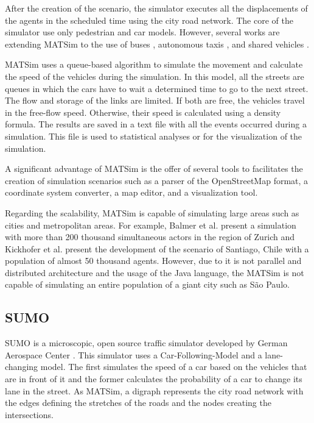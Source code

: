 After the creation of the scenario, the simulator executes all the displacements of the agents in the scheduled time using the city road network. The core of the simulator use only pedestrian and car models. However, several works are extending MATSim to the use of buses \cite{fourie2014reconstructing}, autonomous taxis \cite{bischoff2016simulation}, and shared vehicles \cite{balac2018modeling}. 

MATSim uses a queue-based algorithm to simulate the movement and calculate the speed of the vehicles during the simulation. In this model, all the streets are queues in which the cars have to wait a determined time to go to the next street. The flow and storage of the links are limited. If both are free, the vehicles travel in the free-flow speed. Otherwise, their speed is calculated using a density formula. The results are saved in a text file with all the events occurred during a simulation. This file is used to statistical analyses or for the visualization of the simulation.

A significant advantage of MATSim is the offer of several tools to facilitates the creation of simulation scenarios such as a parser of the OpenStreetMap format, a coordinate system converter, a map editor, and a visualization tool. 

Regarding the scalability, MATSim is capable of simulating large areas such as cities and metropolitan areas. For example, Balmer et al. \cite{balmer2008agent} present a simulation with more than 200 thousand simultaneous actors in the region of Zurich and Kickhofer et al. \cite{kickhofer2016creating} present the development of the scenario of Santiago, Chile with a population of almost 50 thousand agents. However, due to it is not parallel and distributed architecture and the usage of the Java language, the MATSim is not capable of simulating an entire population of a giant city such as S\~ao Paulo.

\subsection{SUMO}

SUMO is a microscopic, open source traffic simulator developed by German Aerospace Center \cite{behrisch2011sumo}. This simulator uses a Car-Following-Model and a lane-changing model. The first simulates the speed of a car based on the vehicles that are in front of it and the former calculates the probability of a car to change its lane in the street. As MATSim, a digraph represents the city road network with the edges defining the stretches of the roads and the nodes creating the intersections.


